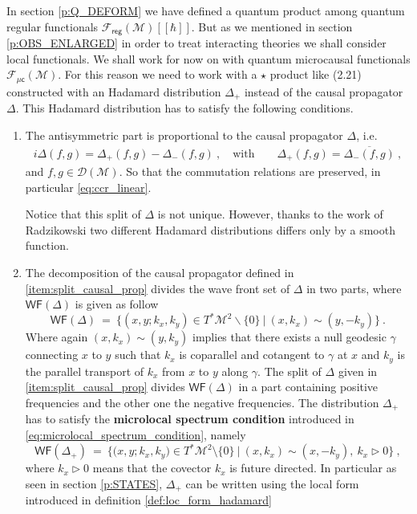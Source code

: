 \documentclass[11pt]{book}
\newcommand{\WF}{\mathsf{WF}}
\newcommand{\reg}{\mathsf{reg}}
\newcommand{\Dcal}{\mathcal{D}}
\newcommand{\Fcal}{\mathcal{F}}
\newcommand{\Mcal}{\mathcal{M}}
\theoremstyle{break}
\begin{document}
In section \ref{p:Q_DEFORM} we have defined a quantum product among quantum regular functionals $\Fcal_\reg(\Mcal)[[\hbar]]$. But as we mentioned in section \ref{p:OBS_ENLARGED} in order to treat interacting theories we shall consider local functionals. We shall work for now on with quantum microcausal functionals $\Fcal_{\mathsf{\mu c}}(\Mcal)$. For this reason we need to work with a $\star$ product like (2.21) constructed with  an Hadamard distribution $\Delta_+$ instead of the causal propagator $\Delta$. This Hadamard distribution has to satisfy the following conditions.
%
\begin{enumerate}
\item\label{item:split_causal_prop} The antisymmetric part is proportional to the causal propagator $\Delta$, i.e. 
%
\begin{eqnarray*}
i \Delta(f,g) = \Delta_+(f,g) - \Delta_-(f,g) \ , \quad \mbox{with} \qquad \Delta_+(f,g) = \overline{\Delta_-(f,g)} \ ,
\end{eqnarray*}
%
and $f,g \in \Dcal(\Mcal)$. So that the commutation relations are preserved, in particular \eqref{eq:ccr_linear}.\par%
%
Notice that this split of $\Delta$ is not unique. However, thanks to the work of Radzikowski \cite{radzikowski_micro-local_1996} two different Hadamard distributions differs only by a smooth function. 

\item The decomposition of the causal propagator defined in \ref{item:split_causal_prop} divides the wave front set of $\Delta$ in two parts, where $\WF(\Delta)$ is given as follow
%
\begin{equation}
\WF(\Delta) \ = \ \bigg\{ \left(x,y;k_x,k_y\right) \in T^{\ast}\Mcal^{2} \backslash\{0\} \ \bigg| \ (x,k_x) \sim (y,-k_y) \bigg\} \ .
\label{eq:wf_causal_prop}
\end{equation}
%
Where again $(x,k_x) \sim (y,k_y)$ implies that there exists a null geodesic $\gamma$ connecting $x$ to $y$ such that $k_x$ is coparallel and cotangent to $\gamma$ at $x$ and $k_y$ is the parallel transport of $k_x$ from $x$ to $y$ along $\gamma$. The split of $\Delta$ given in \ref{item:split_causal_prop} divides $\WF(\Delta)$ in a part containing positive frequencies and the other one the negative frequencies. The distribution $\Delta_+$ has to satisfy the \textbf{microlocal spectrum condition} introduced in \eqref{eq:microlocal_spectrum_condition}, namely
%
\begin{equation}
\WF(\Delta_+) \ = \ \bigg\{ \bigg( x, y ; k_x, k_y \bigg) \in T^\ast\Mcal^2 \setminus \{0\} \ \bigg| \ (x,k_x) \sim (x,-k_y), \ k_x \triangleright 0 \bigg\} \ ,
\label{eq:wf_hadamard}
\end{equation}
%
where $k_x \triangleright 0$ means that the covector $k_x$ is future directed. In particular as seen in section \ref{p:STATES}, $\Delta_+$ can be written using the local form introduced in definition \ref{def:loc_form_hadamard}
\end{enumerate}
\end{document}
